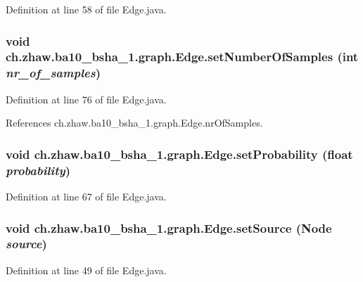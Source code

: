 Definition at line 58 of file Edge.java.\hypertarget{classch_1_1zhaw_1_1ba10__bsha__1_1_1graph_1_1Edge_aa288e1bc553af44b8d23f6c75b1267a8}{
\subsubsection[{setNumberOfSamples}]{\setlength{\rightskip}{0pt plus 5cm}void ch.zhaw.ba10\_\-bsha\_\-1.graph.Edge.setNumberOfSamples (int {\em nr\_\-of\_\-samples})}}
\label{classch_1_1zhaw_1_1ba10__bsha__1_1_1graph_1_1Edge_aa288e1bc553af44b8d23f6c75b1267a8}


Definition at line 76 of file Edge.java.

References ch.zhaw.ba10\_\-bsha\_\-1.graph.Edge.nrOfSamples.\hypertarget{classch_1_1zhaw_1_1ba10__bsha__1_1_1graph_1_1Edge_a17eec389fe6e7025ad328d888dd00f25}{
\subsubsection[{setProbability}]{\setlength{\rightskip}{0pt plus 5cm}void ch.zhaw.ba10\_\-bsha\_\-1.graph.Edge.setProbability (float {\em probability})}}
\label{classch_1_1zhaw_1_1ba10__bsha__1_1_1graph_1_1Edge_a17eec389fe6e7025ad328d888dd00f25}


Definition at line 67 of file Edge.java.\hypertarget{classch_1_1zhaw_1_1ba10__bsha__1_1_1graph_1_1Edge_a266fabf16c1d8d83f79a5e0cdb10a92e}{
\subsubsection[{setSource}]{\setlength{\rightskip}{0pt plus 5cm}void ch.zhaw.ba10\_\-bsha\_\-1.graph.Edge.setSource ({\bf Node} {\em source})}}
\label{classch_1_1zhaw_1_1ba10__bsha__1_1_1graph_1_1Edge_a266fabf16c1d8d83f79a5e0cdb10a92e}


Definition at line 49 of file Edge.java.

